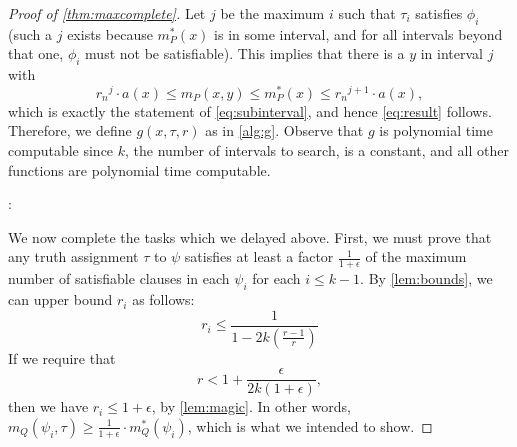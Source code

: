 \documentclass[]{article}
\theoremstyle{plain}
\theoremstyle{definition}
\begin{document}
\begin{proof}[Proof of \autoref{thm:maxcomplete}]
  Let $j$ be the maximum $i$ such that $\tau_i$ satisfies $\phi_i$ (such a $j$ exists because $m^*_P(x)$ is in some interval, and for all intervals beyond that one, $\phi_i$ must not be satisfiable).
  This implies that there is a $y$ in interval $j$ with
  \begin{equation*}
    {r_n}^j \cdot a(x) \leq m_P(x, y) \leq m^*_P(x) \leq {r_n}^{j + 1} \cdot a(x),
  \end{equation*}
  which is exactly the statement of \autoref{eq:subinterval}, and hence \autoref{eq:result} follows.
  Therefore, we define $g(x, \tau, r)$ as in \autoref{alg:g}.
  Observe that $g$ is polynomial time computable since $k$, the number of intervals to search, is a constant, and all other functions are polynomial time computable.
  \begin{algorithm}
    \caption{Deterministic polynomial time algorithm that computes a $r_n$-approximate solution for $x$%
      \label{alg:g}}
    \begin{algorithmic}
      \Statex{}
      :
        \EndFor
         \\
        \hspace{1.5em}
      \EndFunction
    \end{algorithmic}
  \end{algorithm}

  We now complete the tasks which we delayed above.
  First, we must prove that any truth assignment $\tau$ to $\psi$ satisfies at least a factor $\frac{1}{1 + \epsilon}$ of the maximum number of satisfiable clauses in each $\psi_i$ for each $i \leq k - 1$.
  By \autoref{lem:bounds}, we can upper bound $r_i$ as follows:
  \begin{equation*}
    r_i \leq \frac{1}{1 - 2k\left(\frac{r - 1}{r}\right)}
  \end{equation*}
  If we require that
  \begin{equation}\label{eq:rupper}
    r < 1 + \frac{\epsilon}{2k(1 + \epsilon)},
  \end{equation}
  then we have $r_i \leq 1 + \epsilon$, by \autoref{lem:magic}.
  In other words, $m_Q(\psi_i, \tau) \geq \frac{1}{1 + \epsilon} \cdot m^*_Q(\psi_i)$, which is what we intended to show.


\end{proof}
\end{document}
